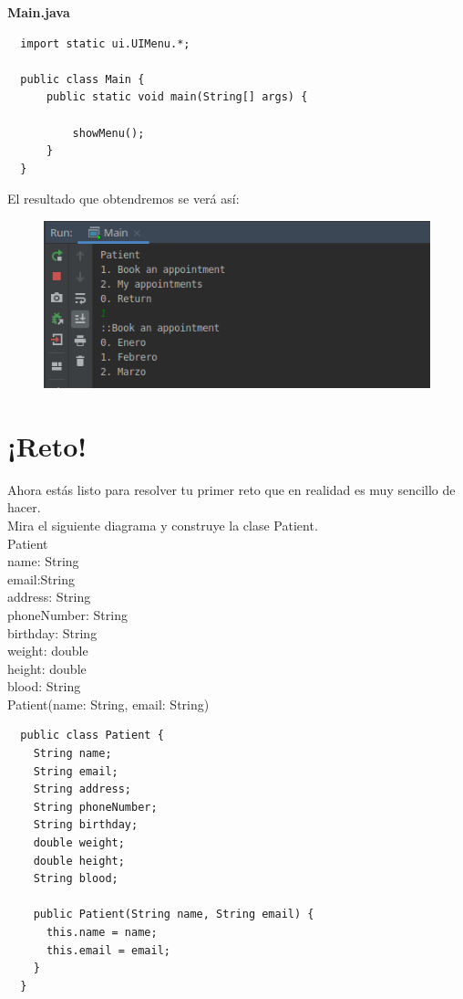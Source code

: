 \documentclass{article}
\begin{document}
\textbf{Main.java}
\begin{verbatim}
  import static ui.UIMenu.*;

  public class Main {
      public static void main(String[] args) {

          showMenu();
      }
  }
\end{verbatim}

El resultado que obtendremos se verá así:
\begin{figure}[h!]
  \centering
  \includegraphics[scale=0.75]{./Pictures/026_resultado_c9.png}
\end{figure}


\section{¡Reto!}%
Ahora estás listo para resolver tu primer reto que en realidad es muy sencillo
de hacer.\\

Mira el siguiente diagrama y construye la clase Patient.\\

Patient\\
name: String\\
email:String\\
address: String\\
phoneNumber: String\\
birthday: String\\
weight: double\\
height: double\\
blood: String\\
Patient(name: String, email: String)\\


\begin{verbatim}
  public class Patient {
    String name;
    String email;
    String address;
    String phoneNumber;
    String birthday;
    double weight;
    double height;
    String blood;

    public Patient(String name, String email) {
      this.name = name;
      this.email = email;
    }
  }
\end{verbatim}
\end{document}
